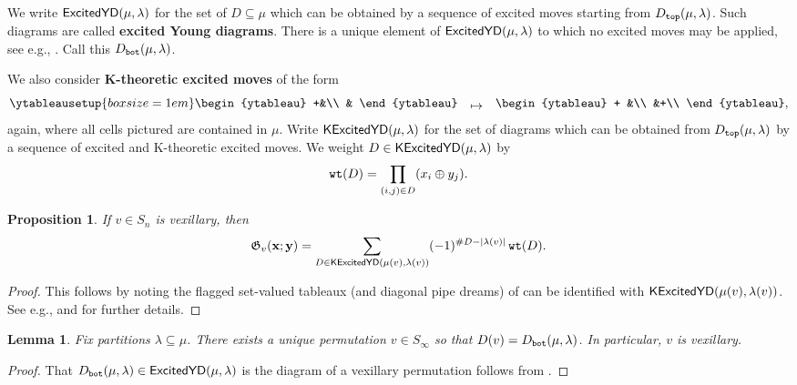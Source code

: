\documentclass[12pt]{amsart}
\newtheorem{lemma}[theorem]{Lemma}
\newtheorem{proposition}[theorem]{Proposition}
\theoremstyle{definition}
\theoremstyle{remark}
\numberwithin{equation}{section}
\newcommand\mydef[1]{{\bf #1}}
\newcommand{\maxexcited}{D_{\tt bot}}
\newcommand{\excited}{{\sf ExcitedYD}}
\newcommand{\kexcited}{{\sf KExcitedYD}}
\newcommand{\wt}{{\tt wt}}
\begin{document}
     We write 
$\excited(\mu,\lambda)$ for the set of $D\subseteq \mu$ which can be obtained by a sequence of excited moves starting from $D_{\tt top}(\mu,\lambda)$.  Such diagrams are called \mydef{excited Young diagrams}.
There is a unique element of $\excited(\mu,\lambda)$ to which no excited moves may be applied, see e.g., \cite[Lemma 7.4]{Weigandt.BPD}.  Call this $\maxexcited(\mu,\lambda)$.  

We also consider \mydef{K-theoretic excited moves} of the form
\begin{equation}\label{eq:EYDkTh}
    \ytableausetup{boxsize=1em}
\begin{ytableau}
+&\\
&
\end{ytableau}
\hspace{1em}
 \raisebox{-.2em}{$\mapsto$}
 \hspace{1em}
\begin{ytableau}
+ &\\
&+\\
\end{ytableau},
\end{equation}
again, where all cells pictured are contained in $\mu$.
Write $\kexcited(\mu,\lambda)$ for the set of diagrams which can be obtained from $D_{\tt top}(\mu,\lambda)$ by a sequence of excited and K-theoretic excited moves.
We weight $D\in\kexcited(\mu,\lambda)$ by \[\wt(D)=\prod_{(i,j)\in D}(x_i\oplus y_j).\]



\begin{proposition}
\label{prop:vexkexcited}
If $v\in S_n$ is vexillary, then \[\mathfrak G_v(\mathbf x;\mathbf y)=\sum_{D\in \kexcited(\mu(v),\lambda(v))}(-1)^{\# D-|\lambda(v)|}\,\wt(D). \]
\end{proposition}
\begin{proof}
This follows by noting the flagged set-valued tableaux (and diagonal pipe dreams) of \cite{KMY} can be identified with $\kexcited(\mu(v),\lambda(v))$.  See e.g., \cite{Graham.Kreiman} and \cite{Weigandt.BPD} for further details.
\end{proof}


\begin{lemma}\label{lem:grassToVex}
Fix partitions $\lambda\subseteq \mu$.  There exists a unique permutation $v\in S_\infty$ so that $D(v)=\maxexcited(\mu,\lambda)$.  In particular, $v$ is vexillary.
\end{lemma}

\begin{proof}
That $\maxexcited(\mu,\lambda)\in\excited(\mu,\lambda)$ is the diagram of a vexillary permutation follows from \cite[Proposition~7.6]{Weigandt.BPD}.
\end{proof}
\end{document}
